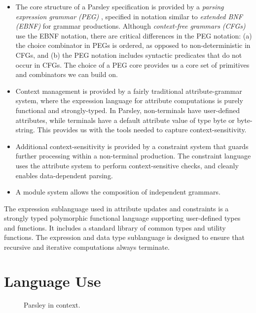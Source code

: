\documentclass[letterpaper]{article}
\begin{document}
\begin{itemize}
\item The core structure of a Parsley specification is provided by a
  {\em parsing expression grammar (PEG)} \cite{ford2004popl},
  specified in notation similar to {\em extended BNF (EBNF)} for
  grammar productions.  Although {\em context-free grammars (CFGs)}
  use the EBNF notation, there are critical differences in the PEG
  notation: (a) the choice combinator in PEGs is ordered, as opposed
  to non-deterministic in CFGs, and (b) the PEG notation includes
  syntactic predicates that do not occur in CFGs.  The choice of a PEG
  core provides us a core set of primitives and combinators we can
  build on.

\item Context management is provided by a fairly traditional
  attribute-grammar system, where the expression language for
  attribute computations is purely functional and strongly-typed.  In
  Parsley, non-terminals have user-defined attributes, while terminals
  have a default attribute value of type byte or byte-string.  This
  provides us with the tools needed to capture context-sensitivity.

\item Additional context-sensitivity is provided by a constraint
  system that guards further processing within a non-terminal
  production.  The constraint language uses the attribute system to
  perform context-sensitive checks, and cleanly enables data-dependent
  parsing.

\item A module system allows the composition of independent grammars.
\end{itemize}

The expression sublanguage used in attribute updates and constraints
is a strongly typed polymorphic functional language supporting
user-defined types and functions.  It includes a standard library of
common types and utility functions.  The expression and data type
sublanguage is designed to ensure that recursive and iterative
computations always terminate.

\section{Language Use}
\label{s:use}

\begin{figure*}[!ht]
  \centering
  \resizebox{10cm}{!}{}
  \caption{Parsley in context.}
  \label{f:pipeline}
\end{figure*}
\end{document}
